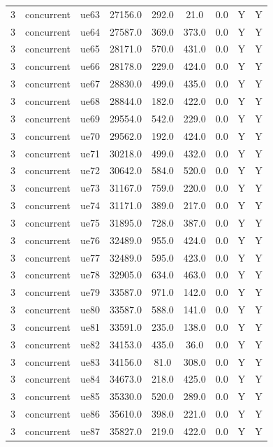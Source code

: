 \begin{table}[ht]
\begin{tabular}{|c|c|c|c|c|c|c|c|c|}
3 & concurrent & ue63 & 27156.0 & 292.0 & 21.0 & 0.0 & Y & Y \\
3 & concurrent & ue64 & 27587.0 & 369.0 & 373.0 & 0.0 & Y & Y \\
3 & concurrent & ue65 & 28171.0 & 570.0 & 431.0 & 0.0 & Y & Y \\
3 & concurrent & ue66 & 28178.0 & 229.0 & 424.0 & 0.0 & Y & Y \\
3 & concurrent & ue67 & 28830.0 & 499.0 & 435.0 & 0.0 & Y & Y \\
3 & concurrent & ue68 & 28844.0 & 182.0 & 422.0 & 0.0 & Y & Y \\
3 & concurrent & ue69 & 29554.0 & 542.0 & 229.0 & 0.0 & Y & Y \\
3 & concurrent & ue70 & 29562.0 & 192.0 & 424.0 & 0.0 & Y & Y \\
3 & concurrent & ue71 & 30218.0 & 499.0 & 432.0 & 0.0 & Y & Y \\
3 & concurrent & ue72 & 30642.0 & 584.0 & 520.0 & 0.0 & Y & Y \\
3 & concurrent & ue73 & 31167.0 & 759.0 & 220.0 & 0.0 & Y & Y \\
3 & concurrent & ue74 & 31171.0 & 389.0 & 217.0 & 0.0 & Y & Y \\
3 & concurrent & ue75 & 31895.0 & 728.0 & 387.0 & 0.0 & Y & Y \\
3 & concurrent & ue76 & 32489.0 & 955.0 & 424.0 & 0.0 & Y & Y \\
3 & concurrent & ue77 & 32489.0 & 595.0 & 423.0 & 0.0 & Y & Y \\
3 & concurrent & ue78 & 32905.0 & 634.0 & 463.0 & 0.0 & Y & Y \\
3 & concurrent & ue79 & 33587.0 & 971.0 & 142.0 & 0.0 & Y & Y \\
3 & concurrent & ue80 & 33587.0 & 588.0 & 141.0 & 0.0 & Y & Y \\
3 & concurrent & ue81 & 33591.0 & 235.0 & 138.0 & 0.0 & Y & Y \\
3 & concurrent & ue82 & 34153.0 & 435.0 & 36.0 & 0.0 & Y & Y \\
3 & concurrent & ue83 & 34156.0 & 81.0 & 308.0 & 0.0 & Y & Y \\
3 & concurrent & ue84 & 34673.0 & 218.0 & 425.0 & 0.0 & Y & Y \\
3 & concurrent & ue85 & 35330.0 & 520.0 & 289.0 & 0.0 & Y & Y \\
3 & concurrent & ue86 & 35610.0 & 398.0 & 221.0 & 0.0 & Y & Y \\
3 & concurrent & ue87 & 35827.0 & 219.0 & 422.0 & 0.0 & Y & Y \\

\end{tabular}
\end{table}
